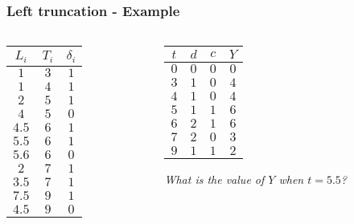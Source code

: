 \documentclass[11pt, aspectratio = 169]{beamer}
\begin{document}
\begin{frame}
  \frametitle{Left truncation - Example}
  \begin{columns}
    \begin{column}[]{0.48\textwidth}
      \begin{center}
        \begin{tabular}{c c c}
          $L_i$ & $T_i$ & $\delta_i$ \\\hline
          $1$ & $3$ & $1$ \\
          $1$ & $4$ & $1$ \\
          $2$ & $5$ & $1$ \\
          $4$ & $5$ & $0$ \\
          $4.5$ & $6$ & $1$ \\
          $5.5$ & $6$ & $1$ \\
          $5.6$ & $6$ & $0$ \\
          $2$ & $7$ & $1$ \\
          $3.5$ & $7$ & $1$ \\
          $7.5$ & $9$ & $1$ \\
          $4.5$ & $9$ & $0$ \\\hline
        \end{tabular}
      \end{center}
    \end{column}
    \begin{column}[]{0.48\textwidth}
      \begin{center}
        \begin{tabular}{c c c c}
          $t$ & $d$ & $c$ & $Y$ \\\hline
          $0$ & $0$ & $0$ & $0$ \\
          $3$ & $1$ & $0$ & $4$ \\
          $4$ & $1$ & $0$ & $4$ \\
          $5$ & $1$ & $1$ & $6$ \\
          $6$ & $2$ & $1$ & $6$ \\
          $7$ & $2$ & $0$ & $3$ \\
          $9$ & $1$ & $1$ & $2$ \\\hline
        \end{tabular}
      \end{center}
      \textit{What is the value of $Y$ when $t = 5.5$?}
    \end{column}
  \end{columns}
\end{frame}
\end{document}
